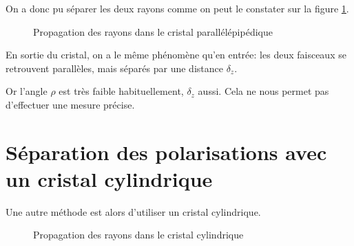 \documentclass[a4paper,11pt]{report}
\begin{document}
On a donc pu séparer les deux rayons comme on peut le constater sur la figure \ref{cristalparallelepipede}.

\begin{figure}[h]
    \begin{center}
        \caption{Propagation des rayons dans le cristal parallélépipédique}
        \label{cristalparallelepipede}
    \end{center}
\end{figure}

En sortie du cristal, on a le même phénomène qu'en entrée: les deux faisceaux se retrouvent parallèles, mais séparés par une distance $\delta_z$.

Or l'angle $\rho$ est très faible habituellement, $\delta_z$ aussi. Cela ne nous permet pas d'effectuer une mesure précise.
\section{Séparation des polarisations avec un cristal cylindrique}
Une autre méthode est alors d'utiliser un cristal cylindrique.

\begin{figure}[h]
    \begin{center}
        \caption{Propagation des rayons dans le cristal cylindrique}
        \label{cristalcylindrique}
    \end{center}
\end{figure}
\end{document}
